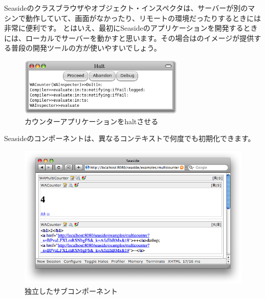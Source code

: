 \documentclass[a4paper,10pt,twoside]{book}
\begin{document}
Seasideのクラスブラウザやオブジェクト・インスペクタは、サーバーが別のマシンで動作していて、画面がなかったり、リモートの環境だったりするときには非常に便利です。
とはいえ、最初にSeasideのアプリケーションを開発するときには、ローカルでサーバーを動かすと思います。その場合は\pharo のイメージが提供する普段の開発ツールの方が使いやすいでしょう。

\begin{figure}[ht]
\begin{center}
\includegraphics[width=0.7\textwidth]{haltingCounter}
\caption{カウンターアプリケーションをhaltさせる}
\end{center}
\end{figure}


Seasideのコンポーネントは、異なるコンテキストで何度でも初期化できます。

\begin{figure}[ht]
\begin{center}
\includegraphics[width=\textwidth]{multiCounterHalos}
\caption{独立したサブコンポーネント}
\end{center}
\end{figure}
\end{document}
